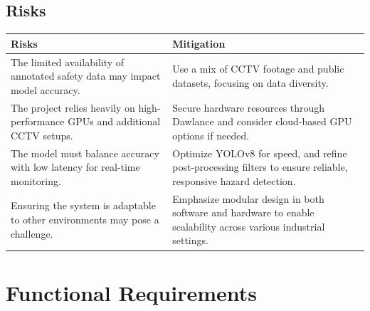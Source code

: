 \documentclass[12pt]{article}
\begin{document}
\subsection*{Risks}

\begin{table}[h!]
\centering
    \begin{tabular}{|p{7cm}|p{7cm}|}
    \hline
    \textbf{Risks} & \textbf{Mitigation} \\
    \hline
    The limited availability of annotated safety data may impact model accuracy. & Use a mix of CCTV footage and public datasets, focusing on data diversity. \\
    \hline
    The project relies heavily on high-performance GPUs and additional CCTV setups. & Secure hardware resources through Dawlance and consider cloud-based GPU options if needed. \\
    \hline
    The model must balance accuracy with low latency for real-time monitoring. & Optimize YOLOv8 for speed, and refine post-processing filters to ensure reliable, responsive hazard detection. \\
    \hline
    Ensuring the system is adaptable to other environments may pose a challenge. & Emphasize modular design in both software and hardware to enable scalability across various industrial settings. \\
    \hline
    \end{tabular}
\end{table}



\section{Functional Requirements}
\end{document}

